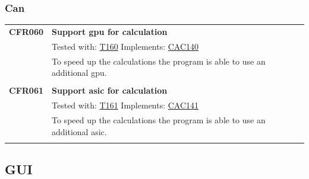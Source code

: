 \documentclass[parskip=full]{scrartcl}
\begin{document}
\subsubsection{Can}
\begin{tabular}{p{2cm}p{11.4cm}}
\textbf {CFR060} \hypertarget{CFR060} & \textbf{Support \gls{gpu} for calculation} \\
& Tested with: \hyperlink{T160}{T160} Implements: \hyperlink{CAC140}{CAC140} \\
& To speed up the calculations the program is able to use an additional \gls{gpu}.\\
& \\
\textbf {CFR061} \hypertarget{CFR061} & \textbf{Support \gls{asic} for calculation} \\
& Tested with: \hyperlink{T161}{T161} Implements: \hyperlink{CAC141}{CAC141} \\
& To speed up the calculations the program is able to use an additional \gls{asic}.\\
& \\
\end{tabular}

\newpage

\subsection{GUI}
\end{document}
